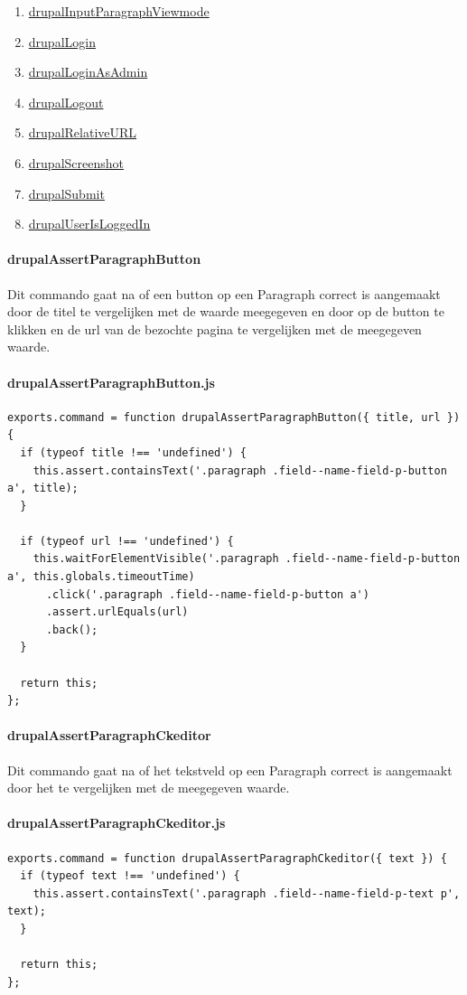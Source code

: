 \begin{enumerate}
\item \hyperref[commando26]{drupalInputParagraphViewmode}
\item \hyperref[commando27]{drupalLogin}
\item \hyperref[commando28]{drupalLoginAsAdmin}
\item \hyperref[commando29]{drupalLogout}
\item \hyperref[commando30]{drupalRelativeURL}
\item \hyperref[commando31]{drupalScreenshot}
\item \hyperref[commando32]{drupalSubmit}
\item \hyperref[commando33]{drupalUserIsLoggedIn}
\end{enumerate}

\clearpage
\paragraph{drupalAssertParagraphButton}
\label{commando1}
Dit commando gaat na of een button op een Paragraph correct is aangemaakt door de titel te vergelijken met de waarde meegegeven en door op de button te klikken en de url van de bezochte pagina te vergelijken met de meegegeven waarde.
\paragraph{drupalAssertParagraphButton.js}
\begin{lstlisting}[breaklines=true]
exports.command = function drupalAssertParagraphButton({ title, url }) {
  if (typeof title !== 'undefined') {
    this.assert.containsText('.paragraph .field--name-field-p-button a', title);
  }

  if (typeof url !== 'undefined') {
    this.waitForElementVisible('.paragraph .field--name-field-p-button a', this.globals.timeoutTime)
      .click('.paragraph .field--name-field-p-button a')
      .assert.urlEquals(url)
      .back();
  }

  return this;
};
\end{lstlisting}


\clearpage
\paragraph{drupalAssertParagraphCkeditor}
\label{commando2}
Dit commando gaat na of het tekstveld op een Paragraph correct is aangemaakt door het te vergelijken met de meegegeven waarde.
\paragraph{drupalAssertParagraphCkeditor.js}
\begin{lstlisting}[breaklines=true]
exports.command = function drupalAssertParagraphCkeditor({ text }) {
  if (typeof text !== 'undefined') {
    this.assert.containsText('.paragraph .field--name-field-p-text p', text);
  }

  return this;
};
\end{lstlisting}


